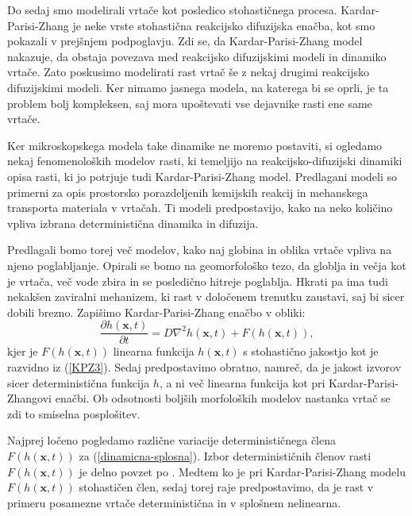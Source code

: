 \documentclass[a4paper, twoside, 12pt]{book}
\begin{document}
Do sedaj smo modelirali vrtače kot posledico stohastičnega procesa. Kardar-Parisi-Zhang je neke vrste stohastična reakcijsko difuzijska enačba, kot smo pokazali v prejšnjem podpoglavju. Zdi se, da Kardar-Parisi-Zhang model nakazuje, da obstaja povezava med reakcijsko difuzijskimi modeli in dinamiko vrtače. Zato poskusimo modelirati rast vrtač še z nekaj drugimi reakcijsko difuzijskimi modeli. Ker nimamo jasnega modela, na katerega bi se oprli, je ta problem bolj kompleksen, saj mora upoštevati vse dejavnike rasti ene same vrtače. 

Ker mikroskopskega modela take dinamike ne moremo postaviti, si ogledamo nekaj fenomenoloških modelov rasti, ki temeljijo na reakcijsko-difuzijski dinamiki opisa rasti, ki jo potrjuje tudi Kardar-Parisi-Zhang model. Predlagani modeli so primerni za opis prostorsko porazdeljenih kemijskih reakcij in mehanskega transporta materiala v vrtačah. Ti modeli predpostavijo, kako na neko količino vpliva izbrana deterministična dinamika in difuzija.

Predlagali bomo torej več modelov, kako naj globina in oblika vrtače vpliva na njeno poglabljanje. Opirali se bomo na geomorfološko tezo, da globlja in večja kot je vrtača, več vode zbira in se posledično hitreje poglablja. Hkrati pa ima tudi nekakšen zaviralni mehanizem, ki rast v določenem trenutku zaustavi, saj bi sicer dobili brezno.
Zapišimo Kardar-Parisi-Zhang enačbo v obliki:
\begin{equation}
  \frac{ \partial h(\mathbf{x},t) }{ \partial t} = D \nabla^2 h(\mathbf{x},t) + F(h(\mathbf{x},t)),
  \label{dinamicna-splosna}
\end{equation}
kjer je $F(h(\mathbf{x},t))$ linearna funkcija $h(\mathbf{x},t)$ s stohastično jakostjo kot je razvidno iz (\ref{KPZ3}). Sedaj predpostavimo obratno, namreč, da je jakost izvorov sicer deterministična funkcija $h$, a ni več linearna funkcija kot pri Kardar-Parisi-Zhangovi enačbi. Ob odsotnosti boljših morfoloških modelov nastanka vrtač se zdi to smiselna posplošitev.

Najprej ločeno pogledamo različne variacije determinističnega člena \newline $F(h(\mathbf{x},t))$ za (\ref{dinamicna-splosna}). Izbor determinističnih členov rasti $F(h(\mathbf{x},t))$ je delno povzet po \cite{kandler2010population}. Medtem ko je pri Kardar-Parisi-Zhang modelu $F(h(\mathbf{x},t))$ stohastičen člen, sedaj torej raje predpostavimo, da je rast v primeru posamezne vrtače deterministična in v splošnem nelinearna.
\end{document}
